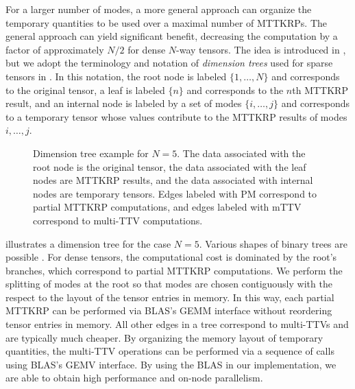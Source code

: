 For a larger number of modes, a more general approach can organize the temporary quantities to be used over a maximal number of MTTKRPs.
The general approach can yield significant benefit, decreasing the computation by a factor of approximately $N/2$ for dense $N$-way tensors.
The idea is introduced in \cite{PTC13a}, but we adopt the terminology and notation of \emph{dimension trees} used for sparse tensors in \cite{KU16-TR,Kaya17}.
In this notation, the root node is labeled $\{1,\dots,N\}$ and corresponds to the original tensor, a leaf is labeled $\{n\}$ and corresponds to the $n$th MTTKRP result, and an internal node is labeled by a set of modes $\{i,\dots,j\}$ and corresponds to a temporary tensor whose values contribute to the MTTKRP results of modes $i,\dots,j$.

\begin{figure}

\caption{Dimension tree example for $N=5$. 
The data associated with the root node is the original tensor, the data associated with the leaf nodes are MTTKRP results, and the data associated with internal nodes are temporary tensors.  
Edges labeled with PM correspond to partial MTTKRP computations, and edges labeled with mTTV correspond to multi-TTV computations.}
\label{fig:DT}
\end{figure}

 illustrates a dimension tree for the case $N=5$.
Various shapes of binary trees are possible \cite{PTC13a,Kaya17}.
For dense tensors, the computational cost is dominated by the root's branches, which correspond to partial MTTKRP computations.
We perform the splitting of modes at the root so that modes are chosen contiguously with the respect to the layout of the tensor entries in memory.
In this way, each partial MTTKRP can be performed via BLAS's GEMM interface without reordering tensor entries in memory.
All other edges in a tree correspond to multi-TTVs and are typically much cheaper.
By organizing the memory layout of temporary quantities, the multi-TTV operations can be performed via a sequence of calls using BLAS's GEMV interface.
By using the BLAS in our implementation, we are able to obtain high performance and on-node parallelism.

